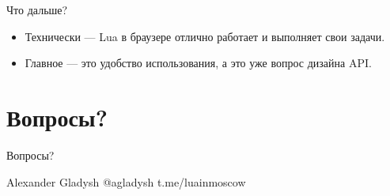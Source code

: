 \documentclass[aspectratio=169,handout,bigger]{beamer}
\begin{document}
\begin{frame}{Что дальше?}

\begin{itemize}
\item Технически — Lua в браузере отлично работает и выполняет свои задачи.
\item Главное — это удобство использования, а это уже вопрос дизайна API.
\end{itemize}

\end{frame}


\section{Вопросы?}


\begin{frame}{Вопросы?}

Alexander Gladysh\newline
@agladysh\newline
\newline
t.me/luainmoscow

\end{frame}

\end{document}
